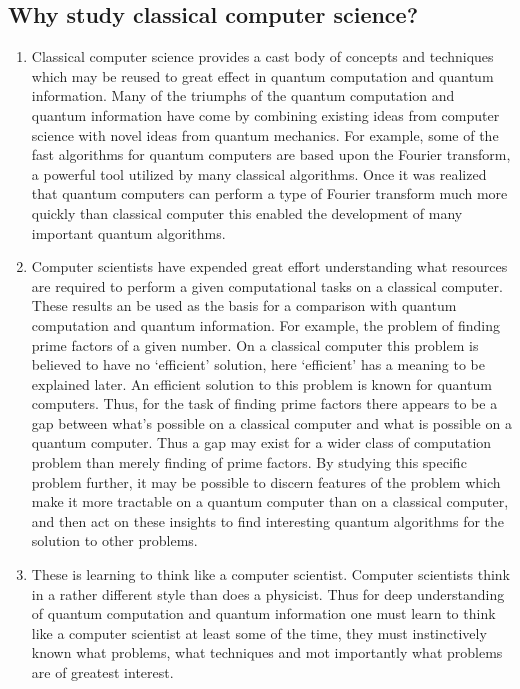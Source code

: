\documentclass[12pt, oneside]{book}
\theoremstyle{definition}
\theoremstyle{definition}
\theoremstyle{remark}
\begin{document}
\subsection{Why study classical computer science?}
\begin{enumerate}
    \item Classical computer science provides a cast body of concepts and techniques which may be reused to great effect in quantum computation and quantum information. Many of the triumphs of the quantum computation and quantum information have come by combining existing ideas from computer science with novel ideas from quantum mechanics. For example, some of the fast algorithms for quantum computers are based upon the Fourier transform, a powerful tool utilized by many classical algorithms. Once it was realized that quantum computers can perform a type of Fourier transform much more quickly than classical computer this enabled the development of many important quantum algorithms.
    \item Computer scientists have expended great effort understanding what resources are required to perform a given computational tasks on a classical computer. These results an be used as the basis for a comparison with quantum computation and quantum information. For example, the problem of finding prime factors of a given number. On a classical computer this problem is believed to have no `efficient' solution, here `efficient' has a meaning to be explained later. An efficient solution to this problem is known for quantum computers. Thus, for the task of finding prime factors there appears to be a gap between what's possible on a classical computer and what is possible on a quantum computer. Thus a gap may exist for a wider class of computation problem than merely finding of prime factors. By studying this specific problem further, it may be possible to discern features of the problem which make it more tractable on a quantum computer than on a classical computer, and then act on these insights to find interesting quantum algorithms for the solution to other problems.
    \item These is learning to think like a computer scientist. Computer scientists think in a rather different style than does a physicist. Thus for deep understanding of quantum computation and quantum information one must learn to think like a computer scientist at least some of the time, they must instinctively known what problems, what techniques and mot importantly what problems are of greatest interest.
\end{enumerate}
\end{document}
